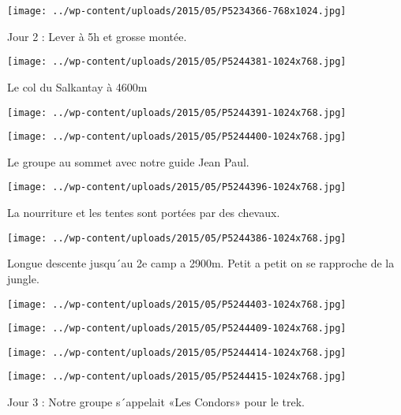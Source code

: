 \centerline{\texttt{[image: ../wp-content/uploads/2015/05/P5234366-768x1024.jpg]} } 
 \newline
 Jour 2 : \newline
 Lever à 5h et grosse montée. \newline
 \newline
\centerline{\texttt{[image: ../wp-content/uploads/2015/05/P5244381-1024x768.jpg]} } 
 \newline
 Le col du Salkantay à 4600m \newline
 \newline
\centerline{\texttt{[image: ../wp-content/uploads/2015/05/P5244391-1024x768.jpg]} } 
 \newline
 \newline
\centerline{\texttt{[image: ../wp-content/uploads/2015/05/P5244400-1024x768.jpg]} } 
 \newline
 Le groupe au sommet avec notre guide Jean Paul. \newline
 \newline
\centerline{\texttt{[image: ../wp-content/uploads/2015/05/P5244396-1024x768.jpg]} } 
 \newline
 La nourriture et les tentes sont portées par des chevaux. \newline
 \newline
\centerline{\texttt{[image: ../wp-content/uploads/2015/05/P5244386-1024x768.jpg]} } 
 \newline
 Longue descente jusqu´au 2e camp a 2900m. Petit a petit on se rapproche de la jungle. \newline
 \newline
\centerline{\texttt{[image: ../wp-content/uploads/2015/05/P5244403-1024x768.jpg]} } 
 \newline
 \newline
\centerline{\texttt{[image: ../wp-content/uploads/2015/05/P5244409-1024x768.jpg]} } 
 \newline
 \newline
\centerline{\texttt{[image: ../wp-content/uploads/2015/05/P5244414-1024x768.jpg]} } 
 \newline
 \newline
\centerline{\texttt{[image: ../wp-content/uploads/2015/05/P5244415-1024x768.jpg]} } 
 \newline
 Jour 3 : \newline
 Notre groupe s´appelait «Les Condors» pour le trek. \newline
